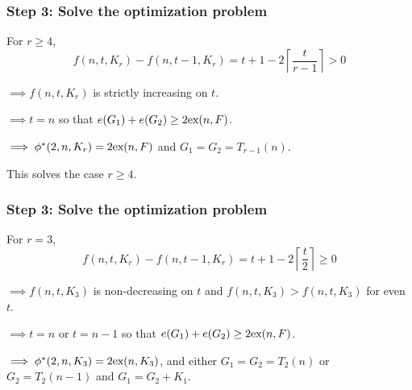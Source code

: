 \documentclass{beamer}
\newcommand*{\ex}{\textnormal{ex}}
\begin{document}
\begin{frame}
  \frametitle{Step 3: Solve the optimization problem}

  For $r \geq 4$,
  \[
    f(n, t, K_r) - f(n, t - 1, K_r) = t + 1 - 2\left\lceil \frac{t}{r - 1} \right\rceil > 0
  \]

  \pause

  \vspace{0.5cm}

  $\implies f(n, t, K_r)$ is strictly increasing on $t$.

  \pause

  \vspace{0.5cm}

  $\implies t = n$ so that $e(G_1) + e(G_2) \geq 2\ex(n, F)$.

  \pause

  \vspace{0.5cm}

  $\implies \phi^*(2, n, K_r) = 2\ex(n, F)$ and $G_1 = G_2 = T_{r - 1}(n)$.

  \vspace{0.5cm}

  This solves the case $r \geq 4$.
\end{frame}

\begin{frame}
  \frametitle{Step 3: Solve the optimization problem}

  For $r = 3$,
  \[
    f(n, t, K_r) - f(n, t - 1, K_r) = t + 1 - 2\left\lceil \frac{t}{2} \right\rceil \geq 0
  \]

  \pause

  \vspace{0.5cm}

  $\implies f(n, t, K_3)$ is non-decreasing on $t$ and $f(n, t, K_3) > f(n, t, K_3)$ for even $t$.

  \pause

  \vspace{0.5cm}

  $\implies t = n$ or $t = n - 1$ so that $e(G_1) + e(G_2) \geq 2\ex(n, F)$.

  \pause

  \vspace{0.5cm}

  $\implies \phi^*(2, n, K_3) = 2\ex(n, K_3)$, and either $G_1 = G_2 = T_{2}(n)$ or $G_2 = T_{2}(n - 1)$ and $G_1 = G_2 + K_1$.
\end{frame}
\end{document}
